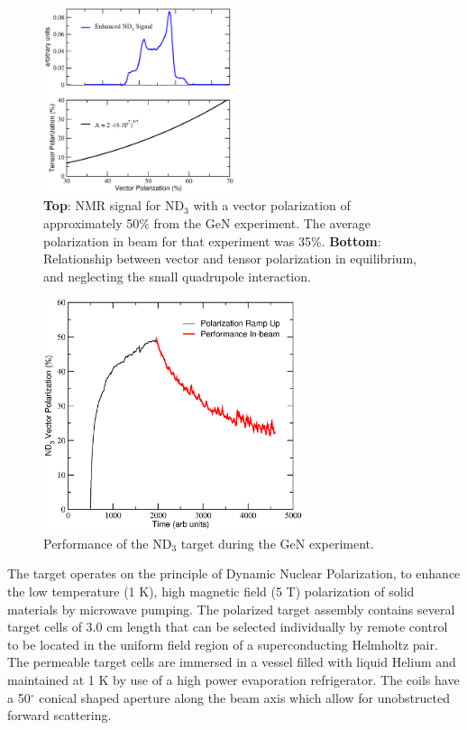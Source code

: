 \begin{figure}
\centering
\includegraphics[width=0.5\textwidth]{figs/tensor_pol3.eps}
\caption{{\bf Top}: NMR signal for ND$_3$ with a vector polarization of approximately 50\% from the GeN experiment.  The average polarization in beam for that experiment was 35\%. 
{\bf Bottom}: Relationship between vector and tensor polarization in equilibrium, and 
neglecting the small quadrupole interaction.  \label{fig:tensorpol}}
\end{figure}

\begin{figure}
\centering
\includegraphics[width=3.0in,clip]{figs/gen.eps} %
\caption{Performance of the ND$_3$ target during the GeN experiment.  \label{fig:gen}}
\end{figure}


The target operates on the principle of Dynamic Nuclear Polarization, to
enhance the low temperature (1 K), high magnetic field (5 T) polarization of solid
materials  by microwave pumping.
The polarized target assembly contains several target cells of 3.0 cm length
that can be  selected individually by remote control to be located in the uniform field
region of a superconducting Helmholtz pair. The permeable target cells are
immersed in a  vessel filled with liquid Helium and maintained at 1 K by use of a
high power evaporation refrigerator.
The coils have a 50$^\circ$ conical shaped aperture along the beam axis
which allow for unobstructed forward scattering.

